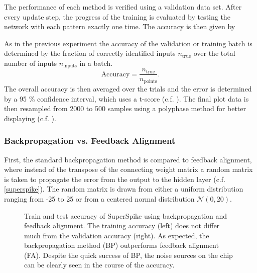 The performance of each method is verified using a validation data set. After every update step, the progress of the training is evaluated by testing the network with each pattern exactly one time. The accuracy is then given by 

As in the previous experiment the accuracy of the validation or training batch is determined by the fraction of correctly identified inputs $n_\text{true}$ over the total number of inputs $n_\text{inputs}$ in a batch.
\begin{equation}
\text{Accuracy} = \frac{n_\text{true}}{n_\text{points}}.
\end{equation}
The overall accuracy is then averaged over the trials and the error is determined by a 95 \% confidence interval, which uses a t-score (c.f. \citealp{Smithson2011}). The final plot data is then resampled from 2000 to 500 samples using a polyphase method for better displaying (c.f. \citealp{scipypolyresample}).

\subsubsection*{Backpropagation vs. Feedback Alignment}
First, the standard backpropagation method is compared to feedback alignment, where instead of the transpose of the connecting weight matrix a random matrix is taken to propagate the error from the output to the hidden layer (c.f. \cref{superspike}). The random matrix is drawn from either a uniform distribution ranging from -25 to 25 or from a centered normal distribution $\mathcal{N}(0, 20)$.

\begin{figure}
	\begin{subfigure}[c]{0.5\textwidth}
		\centering
		
		\label{bptrain73}
	\end{subfigure}	
	\begin{subfigure}[c]{0.5\textwidth}
		\centering
		
		\label{bptest73}
	\end{subfigure}
	\caption[Train and test accuracy of SuperSpike using backpropagation and feedback alignment.]{Train and test accuracy of SuperSpike using backpropagation and feedback alignment. The training accuracy (left) does not differ much from the validation accuracy (right). As expected, the backpropagation method (BP) outperforms feedback alignment (FA). Despite the quick success of BP, the noise sources on the chip can be clearly seen in the course of the accuracy.}
	\label{BPvsFA73}
\end{figure}

